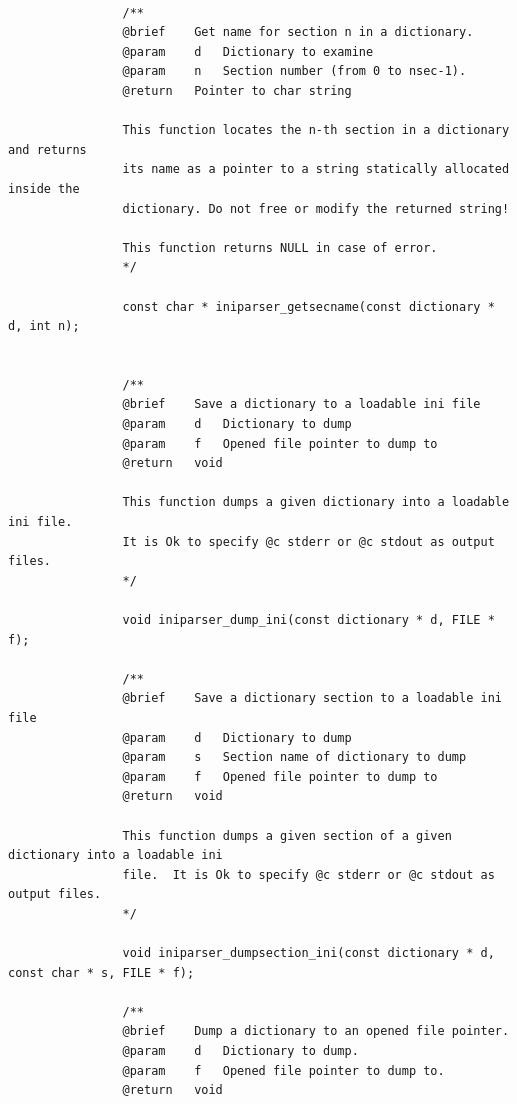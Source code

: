 \documentclass{article}
\begin{document}
\begin{Verbatim}[gobble=8]
                
                /**
                @brief    Get name for section n in a dictionary.
                @param    d   Dictionary to examine
                @param    n   Section number (from 0 to nsec-1).
                @return   Pointer to char string
                
                This function locates the n-th section in a dictionary and returns
                its name as a pointer to a string statically allocated inside the
                dictionary. Do not free or modify the returned string!
                
                This function returns NULL in case of error.
                */
                
                const char * iniparser_getsecname(const dictionary * d, int n);
                
                
                /**
                @brief    Save a dictionary to a loadable ini file
                @param    d   Dictionary to dump
                @param    f   Opened file pointer to dump to
                @return   void
                
                This function dumps a given dictionary into a loadable ini file.
                It is Ok to specify @c stderr or @c stdout as output files.
                */
                
                void iniparser_dump_ini(const dictionary * d, FILE * f);
                
                /**
                @brief    Save a dictionary section to a loadable ini file
                @param    d   Dictionary to dump
                @param    s   Section name of dictionary to dump
                @param    f   Opened file pointer to dump to
                @return   void
                
                This function dumps a given section of a given dictionary into a loadable ini
                file.  It is Ok to specify @c stderr or @c stdout as output files.
                */
                
                void iniparser_dumpsection_ini(const dictionary * d, const char * s, FILE * f);
                
                /**
                @brief    Dump a dictionary to an opened file pointer.
                @param    d   Dictionary to dump.
                @param    f   Opened file pointer to dump to.
                @return   void
                

\end{Verbatim}
\end{document}

